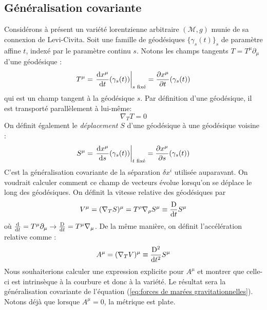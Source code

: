 \subsection{Généralisation covariante}
Considérons à présent un variété lorentzienne arbitraire $(\mathcal{M},g)$ munie de sa connexion de Levi-Civita. Soit une famille de géodésiques $\{\gamma_{s}(t)\}_s$ de paramètre affine $t$, indexé par le paramètre continu $s$. Notons les champs tangents $T = T^{\mu}\partial_{\mu}$ d'une géodésique : 
\begin{equation}
    T^{\mu} = \left. \frac{\mathrm{d} x^{\mu}}{\mathrm{d} t}(\gamma_{s}(t))\right|_{s \text{ fixé}} = \frac{\partial x^{\mu}}{\partial t}(\gamma_{s}(t))
\end{equation}
qui est un champ tangent à la géodésique $s$. Par définition d'une géodésique, il est transporté parallèlement à lui-même:
\begin{equation}
    \nabla_{T}T = 0
\end{equation}
On définit également le \emph{déplacement} $S$ d'une géodésique à une géodésique voisine :
\begin{equation}
    S^{\mu} =\left. \frac{\mathrm{d} x^{\mu}}{\mathrm{d} s}(\gamma_{s}(t))\right|_{t \text{ fixé}}= \frac{\partial x^{\mu}}{\partial s}(\gamma_{s}(t))
\end{equation}
C'est la généralisation covariante de la séparation $\delta x^{i}$ utilisée auparavant. On voudrait calculer comment ce champ de vecteurs évolue lorsqu'on se déplace le long des géodésiques. On définit la vitesse relative des géodésiques par 
\begin{equation}
    V^{\mu} = (\nabla_{T}S)^{\mu} = T^{\rho}\nabla_{\rho}S^{\mu} \equiv \frac{\mathrm{D}}{\mathrm{d} t}S^{\mu}
\end{equation}
où $\frac{\mathrm{d} }{\mathrm{d} t} = T^{\mu}\partial_{\mu} \rightarrow \frac{\mathrm{D} }{\mathrm{d} t} = T^{\mu}\nabla_{\mu}$. De la même manière, on définit l'accélération relative comme :
\begin{equation}
    A^{\mu} = (\nabla_{T}V)^{\mu}\equiv\frac{\mathrm{D} ^2}{\mathrm{d} t^2}S^{\mu}
\end{equation}
Nous souhaiterions calculer une expression explicite pour $A^\mu$ et montrer que celle-ci est intrinsèque à la courbure et donc à la variété.
Le résultat sera la généralisation covariante de l'équation (\ref{eq:forces de marées gravitationnelles}). Notons déjà que lorsque $A^{\mu}=0$, la métrique est plate. 

